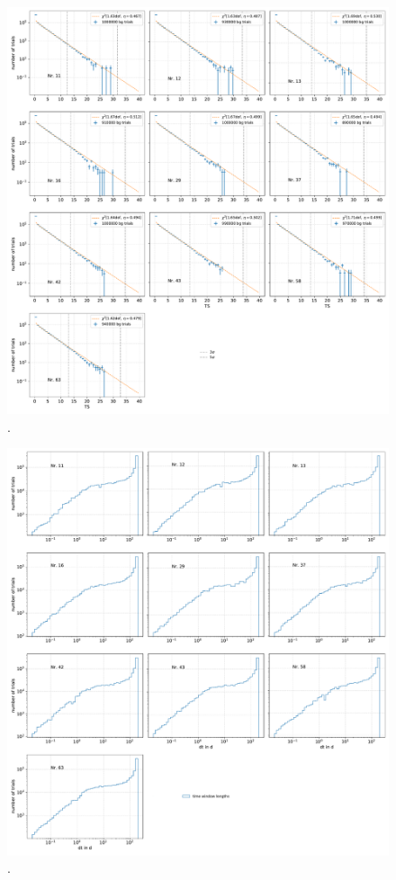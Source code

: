 \begin{figure}
    \centering
    \includegraphics[width=\linewidth]{Plots/05_csky/9_years_gfu_gold_time_dep_bg_t0.pdf}
    \caption{.}
    \label{fig:bg_trials_time_dep}
\end{figure}

\begin{figure}
    \centering
    \includegraphics[width=\linewidth]{Plots/05_csky/9_years_gfu_gold_time_dep_bg_dt.pdf}
    \caption{.}
    \label{fig:bg_trials_time_dep_time_windows}
\end{figure}

